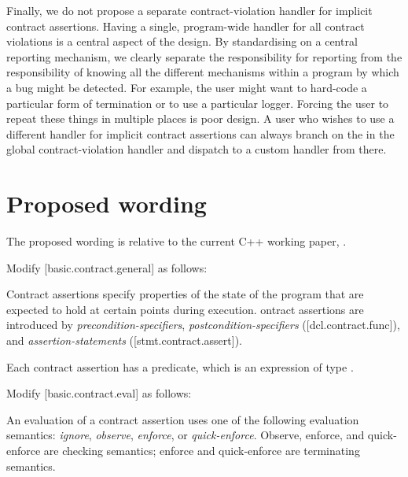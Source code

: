{Finally, we do not propose a separate contract-violation handler for implicit contract assertions. Having a single, program-wide handler for all contract violations is a central aspect of the \cite{P2900R14} design. By standardising on a central reporting mechanism, we clearly separate the responsibility for reporting from the responsibility of knowing all the different mechanisms within a program by which a bug might be detected. For example, the user might want to hard-code a particular form of termination or to use a particular logger. Forcing the user to repeat these things in multiple places is poor design. A user who wishes to use a different handler for implicit contract assertions can always branch on the  in the global contract-violation handler and dispatch to a custom handler from there.


\section{Proposed wording}
\label{wording}

The proposed wording is relative to the current C++ working paper, \cite{N5008}.

Modify [basic.contract.general] as follows:

\begin{adjustwidth}{0.5cm}{0.5cm}
Contract assertions specify properties of the state of the program
that are expected to hold at certain points during execution. ontract assertions
are introduced by \emph{precondition-specifiers}, \emph{postcondition-specifiers} ([dcl.contract.func]),
and \emph{assertion-statements} ([stmt.contract.assert]). 

Each contract assertion has a predicate, which is an expression of type . 
\begin{note}
\end{note}
\end{adjustwidth}

Modify [basic.contract.eval] as follows:

\begin{adjustwidth}{0.5cm}{0.5cm}
An evaluation of a contract assertion uses one of the following  evaluation semantics: 
\emph{ignore}, 
\emph{observe}, 
\emph{enforce}, or 
\emph{quick-enforce}. 
Observe, enforce, and quick-enforce are checking semantics; enforce and quick-enforce are terminating semantics.


\end{adjustwidth}}
